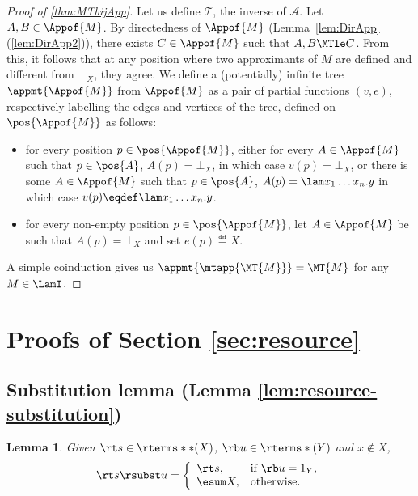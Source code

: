 \documentclass[10pt,a4paper]{amsart}
\newtheorem{lemma}[theorem]{Lemma}
\theoremstyle{definition}
\providecommand{\todo}[2][]{}
\newcommand{\comrci}[1]	{\todo[color=orange,inline]	{Rémy: #1}}
\providecommand{\cal}{\mathcal}
\begin{document}
\begin{proof}[Proof of \cref{thm:MTbijApp}]
	Let us define ${\cal T}$, the inverse of ${\cal A}$.
	Let $A, B\in \Appof{M}$. 
	By directedness of $\Appof{M}$ 
	(Lemma~\ref{lem:DirApp}(\ref{lem:DirApp2})), 
	there exists $C\in\Appof{M}$ such  that $A,B\MTle C$.
	From this, it follows that at any position where 
	two approximants of $M$ are defined and different from $\bot_X$, 
	they agree. 
	We  define a (potentially) infinite tree $\appmt{\Appof{M}}$ 
	from $\Appof{M}$ as a pair of partial functions $(v,e)$, 
	respectively labelling the edges and vertices of the tree, 
	defined on $\pos{\Appof{M}}$ as follows: 
	\begin{itemize}
		\item for every position $p \in \pos{\Appof{M}}$, 
		either for every $A\in \Appof{M}$ such that $p\in\pos{A}$, 
		$A(p)=\bot_X$, in which case $v(p) = \bot_X$, 
		or there is some $A\in \Appof{M}$ such that $p\in\pos{A}$, 
		$A(p)=\lam x_1\ldots x_n.y$ in which case 
		$v(p)\eqdef\lam x_1\ldots x_n.y$.
		\item for every non-empty position $p \in \pos{\Appof{M}}$,
		let $A\in \Appof{M}$ be such that $A(p)=\bot_X$ and 
		set $e(p)\eqdef X$.
	\end{itemize}
	A simple coinduction gives us 
	$\appmt{\mtapp{\MT{M}}}=\MT{M}$ for any $M\in\LamI$.
\end{proof}

\section{Proofs of Section \ref{sec:resource}}


\subsection{Substitution lemma (Lemma \ref{lem:resource-substitution})}


\begin{lemma} \label{lem:rsubst-x-notin-fv}
	Given $\rt s \in \rterms**(X)$, $\rb u \in \rterms*(Y)$
	and $x \notin X$,
	\[	\rt s \rsubst u = \left\{ \begin{array}{ll}
		\rt s, & \text{if $\rb u = 1_Y$,} \\
		\esum X, & \text{otherwise.}
		\end{array} \right. \]
\end{lemma}
\end{document}
